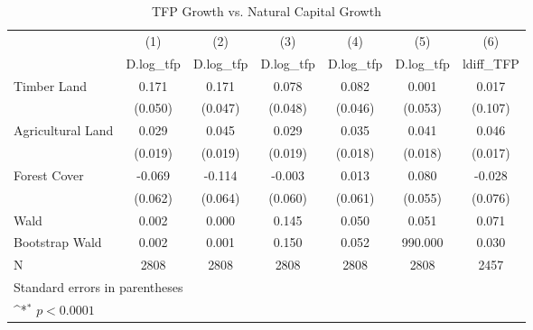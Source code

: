 \begin{table}[htbp]\centering
\def\sym#1{\ifmmode^{#1}\else\(^{#1}\)\fi}
\caption{TFP Growth vs. Natural Capital Growth}
\begin{tabular}{l*{6}{c}}
\hline\hline
            &\multicolumn{1}{c}{(1)}&\multicolumn{1}{c}{(2)}&\multicolumn{1}{c}{(3)}&\multicolumn{1}{c}{(4)}&\multicolumn{1}{c}{(5)}&\multicolumn{1}{c}{(6)}\\
            &\multicolumn{1}{c}{D.log\_tfp}&\multicolumn{1}{c}{D.log\_tfp}&\multicolumn{1}{c}{D.log\_tfp}&\multicolumn{1}{c}{D.log\_tfp}&\multicolumn{1}{c}{D.log\_tfp}&\multicolumn{1}{c}{ldiff\_TFP}\\
\hline
Timber Land &       0.171       &       0.171       &       0.078       &       0.082       &       0.001       &       0.017       \\
            &     (0.050)       &     (0.047)       &     (0.048)       &     (0.046)       &     (0.053)       &     (0.107)       \\
[1em]
Agricultural Land &       0.029       &       0.045       &       0.029       &       0.035       &       0.041       &       0.046       \\
            &     (0.019)       &     (0.019)       &     (0.019)       &     (0.018)       &     (0.018)       &     (0.017)       \\
[1em]
Forest Cover &      -0.069       &      -0.114       &      -0.003       &       0.013       &       0.080       &      -0.028       \\
            &     (0.062)       &     (0.064)       &     (0.060)       &     (0.061)       &     (0.055)       &     (0.076)       \\
\hline
Wald        &       0.002       &       0.000       &       0.145       &       0.050       &       0.051       &       0.071       \\
Bootstrap Wald&       0.002       &       0.001       &       0.150       &       0.052       &     990.000       &       0.030       \\
N           &        2808       &        2808       &        2808       &        2808       &        2808       &        2457       \\
\hline\hline
\multicolumn{7}{l}{\footnotesize Standard errors in parentheses}\\
\multicolumn{7}{l}{\footnotesize \sym{*} \(p<0.0001\)}\\
\end{tabular}
\end{table}
